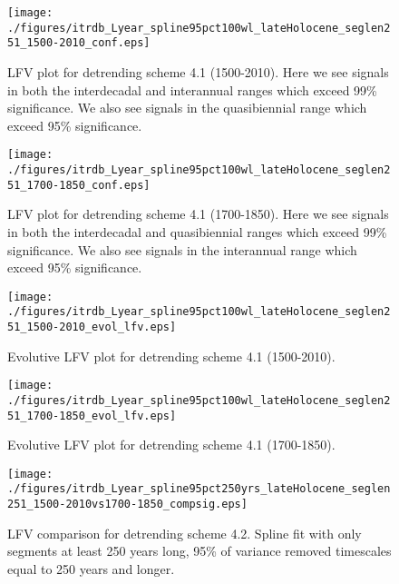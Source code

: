\documentclass[phd,tocprelim]{cornell}
\begin{document}
\begin{figure}[!tbp]
\centering
\begin{minipage}[b]{0.45\textwidth}
\texttt{[image: ./figures/itrdb\_Lyear\_spline95pct100wl\_lateHolocene\_seglen251\_1500-2010\_conf.eps]}
\caption{LFV plot for detrending scheme 4.1 (1500-2010). Here we see signals in both the interdecadal and interannual ranges which exceed 99\% significance. We also see signals in the quasibiennial range which exceed 95\% significance.}
\end{minipage}
\hfill
\label{conf4.1:1500}
\begin{minipage}[b]{0.45\textwidth}
\texttt{[image: ./figures/itrdb\_Lyear\_spline95pct100wl\_lateHolocene\_seglen251\_1700-1850\_conf.eps]}
\caption{LFV plot for detrending scheme 4.1 (1700-1850). Here we see signals in both the interdecadal and quasibiennial ranges which exceed 99\% significance. We also see signals in the interannual range which exceed 95\% significance.}
\label{conf4.1:1700}
\end{minipage}
\end{figure}

\begin{figure}[!tbp]
\centering
\begin{minipage}[b]{0.45\textwidth}
\texttt{[image: ./figures/itrdb\_Lyear\_spline95pct100wl\_lateHolocene\_seglen251\_1500-2010\_evol\_lfv.eps]}

\caption{Evolutive LFV plot for detrending scheme 4.1 (1500-2010).}
\label{evol4.1:1500}

\end{minipage}
\hfill
\begin{minipage}[b]{0.45\textwidth}
\texttt{[image: ./figures/itrdb\_Lyear\_spline95pct100wl\_lateHolocene\_seglen251\_1700-1850\_evol\_lfv.eps]}
\caption{Evolutive LFV plot for detrending scheme 4.1 (1700-1850).}
\label{evol4.1:1700}
\end{minipage}
\end{figure}


\begin{figure}[!tbp]
\centering
\texttt{[image: ./figures/itrdb\_Lyear\_spline95pct250yrs\_lateHolocene\_seglen251\_1500-2010vs1700-1850\_compsig.eps]}

\noindent{}

\caption{LFV comparison for detrending scheme 4.2. Spline fit with only segments at least 250 years long, 95\% of variance removed timescales equal to 250 years and longer.}

\label{compsig4.2}
\end{figure}
\end{document}
